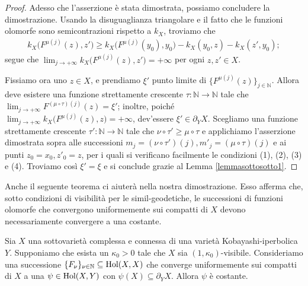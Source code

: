 \begin{proof}
    Adesso che l'asserzione è stata dimostrata, possiamo concludere la dimostrazione. Usando la disuguaglianza triangolare e il fatto che le funzioni olomorfe sono semicontrazioni rispetto a $k_X$, troviamo che
    \begin{gather*}
        k_X\big(F^{\mu(j)}(z),z'\big) \ge k_X\big(F^{\mu(j)}(y_0),y_0\big)-k_X(y_0,z)-k_X(z',y_0);
    \end{gather*}
    segue che $\displaystyle\lim_{j\longrightarrow+\infty}k_X\big(F^{\mu(j)}(z),z'\big)=+\infty$ per ogni $z,z' \in X$.

     Fissiamo ora uno $z\in X$, e prendiamo $\xi'$ punto limite di $\{F^{\mu(j)}(z)\}_{j\in\mathbb{N}}$. Allora deve esistere una funzione strettamente crescente $\tau:\mathbb{N}\longrightarrow\mathbb{N}$ tale che $\displaystyle \lim_{j\longrightarrow+\infty} F^{(\mu\circ\tau)(j)}(z)=\xi'$; inoltre, poiché $\displaystyle\lim_{j\longrightarrow+\infty}k_X\big(F^{\mu(j)}(z),z\big)=+\infty$, dev'essere $\xi'\in\partial_YX$. Scegliamo una funzione strettamente crescente $\tau':\mathbb{N}\longrightarrow\mathbb{N}$ tale che $\nu\circ\tau' \ge \mu\circ\tau$ e applichiamo l'asserzione dimostrata sopra alle successioni $m_j=(\nu\circ\tau')(j), m'_j=(\mu\circ\tau)(j)$ e ai punti $z_0=x_0,z'_0=z$, per i quali si verificano facilmente le condizioni (1), (2), (3) e (4). Troviamo così $\xi'=\xi$ e si conclude grazie al Lemma \ref{lemmasottosotto1}.
\end{proof}

Anche il seguente teorema ci aiuterà nella nostra dimostrazione. Esso afferma che, sotto condizioni di visibilità per le simil-geodetiche, le successioni di funzioni olomorfe che convergono uniformemente sui compatti di $X$ devono necessariamente convergere a una costante.

\begin{thm} \label{lim_is_const}
    Sia $X$ una sottovarietà complessa e connessa di una varietà Kobayashi-iperbolica $Y$. Supponiamo che esista un $\kappa_0>0$ tale che $X$ sia $(1,\kappa_0)$-visibile. Consideriamo una successione $\{F_\nu\}_{\nu\in\mathbb{N}} \subseteq \textnormal{Hol}(X,X)$ che converge uniformemente sui compatti di $X$ a una $\psi\in\textnormal{Hol}(X,Y)$ con $\psi(X)\subseteq\partial_YX$. Allora $\psi$ è costante.
\end{thm}

